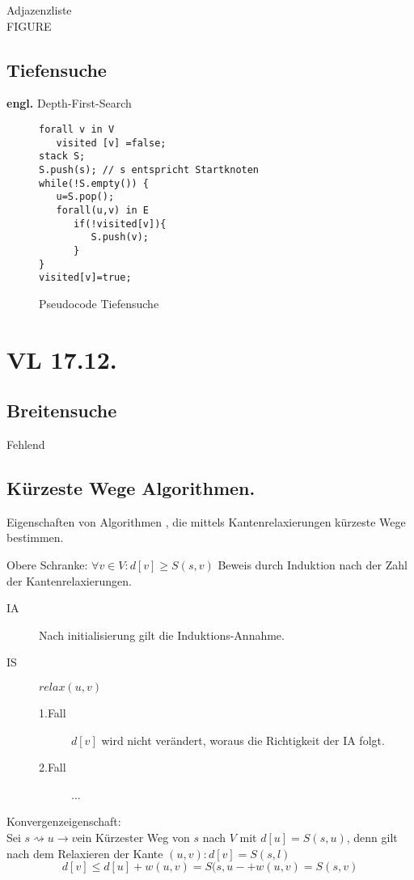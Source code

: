 \documentclass[a4paper,draft,twoside,10pt]{report}
\begin{document}
Adjazenzliste\\
FIGURE\\

\section{Tiefensuche}
\textbf{engl.} Depth-First-Search
\begin{figure}[H]
\begin{verbatim}
forall v in V
   visited [v] =false;
stack S;
S.push(s); // s entspricht Startknoten
while(!S.empty()) {
   u=S.pop();
   forall(u,v) in E
      if(!visited[v]){
         S.push(v);
      }
}
visited[v]=true;
\end{verbatim}
\caption{Pseudocode Tiefensuche}
\end{figure}

\chapter{VL 17.12.}
\section{Breitensuche}
Fehlend
\section{Kürzeste Wege Algorithmen.}
Eigenschaften von Algorithmen , die mittels Kantenrelaxierungen kürzeste Wege bestimmen.

Obere Schranke: $\forall v\in V : d[v] \ge S(s,v)$
Beweis durch Induktion nach der Zahl der Kantenrelaxierungen.
\begin{description}
\item[IA] Nach initialisierung gilt die Induktions-Annahme.
\item[IS] $relax(u,v)$
\begin{description}
\item[1.Fall] $d[v]$ wird nicht verändert, woraus die Richtigkeit der IA folgt.
\item[2.Fall] ...
\end{description}
\end{description}

Konvergenzeigenschaft:\\
Sei $s \rightsquigarrow u\rightarrow v$ein Kürzester Weg von $s$ nach $V$ mit $d[u]=S(s,u)$, denn gilt nach dem Relaxieren der Kante $(u,v):d[v]=S(s,l)$
\[d[v]\le d[u]+w(u,v)=S(s,u-+w(u,v)=S(s,v)\]
\end{document}
